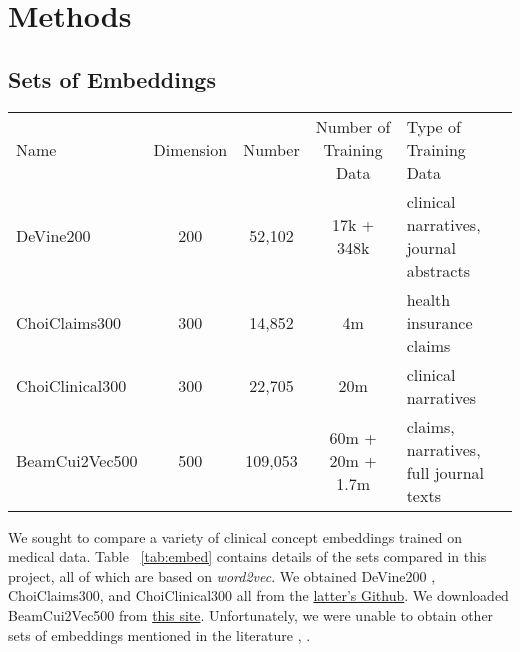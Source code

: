 \documentclass[11pt,a4paper]{article}
\begin{document}
\section{Methods}

\subsection{Sets of Embeddings}

\begin{table*}[h!]
	
	\begin{center}
		\begin{tabular}{lcccl} %
			Name & Dimension & Number & Number of Training Data& Type of Training Data \\
			\hlineB{4}
			DeVine200 & 200 & 52,102 & 17k + 348k &clinical narratives, journal abstracts\\
			\hline
			ChoiClaims300 & 300 & 14,852& 4m&health insurance claims\\
			\hline
			ChoiClinical300 & 300 & 22,705&20m& clinical narratives\\
			\hline
			BeamCui2Vec500 & 500 & 109,053&60m + 20m + 1.7m& claims, narratives, full journal texts\\
		\end{tabular}
	\end{center}
	\caption{Characteristics of the embeddings compared, including the name referred, the embedding dimensions, the number of embeddings in the dataset, and the type of data used to train them.}
	\label{tab:embed}
\end{table*}

We sought to compare a variety of clinical concept embeddings trained on medical data. Table ~\ref{tab:embed} contains details of the sets compared in this project, all of which are based on \emph{word2vec}. We obtained DeVine200 \cite{devineMedicalSemanticSimilarity2014}, ChoiClaims300, and ChoiClinical300 \cite{choiLearningLowDimensionalRepresentations2016} all from the \href{https://github.com/clinicalml/embeddings}{latter's Github}. We downloaded BeamCui2Vec500 \cite{beamClinicalConceptEmbeddings2018} from \href{https://figshare.com/s/00d69861786cd0156d81}{this site}. Unfortunately, we were unable to obtain other sets of embeddings mentioned in the literature \cite{minarro-gimenezExploringApplicationDeep2014}, \cite{zhangAdaptingWordEmbeddings2018} \cite{xiangTimesensitiveClinicalConcept2019}.
\end{document}
